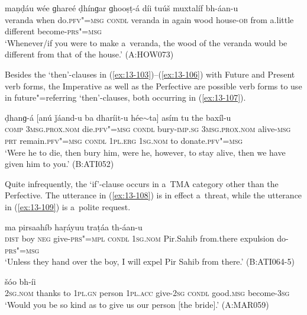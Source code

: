 \begin{exe}
\ex
\label{ex:13-106}
 maṇḍáu wée  ɡhareé ḍhínɡar ɡhooṣṭ-á díi tuúš muxtalíf bh-áan-u  \\
veranda when do.\textsc{pfv"=msg} \textsc{condl} veranda in  again wood house-\textsc{ob} from a.little different become-\textsc{prs"=msg} \\
\glt `Whenever/if you were to make a~veranda, the wood of the veranda would be different from that of the house.' (A:HOW073) 
\end{exe}

Besides the `then'-clauses in (\ref{ex:13-103})--(\ref{ex:13-106}) with Future and Present verb forms, the Imperative as well as the Perfective are possible verb forms to use in future"=referring `then'-clauses, both occurring in (\ref{ex:13-107}).

\begin{exe}
\ex
\label{ex:13-107}
 ḍhanɡ-á  [anú ǰáand-u ba dharíit-u
  hée$\sim$ta]  asím tu the baxíl-u \\
\textsc{comp} \textsc{3msg.prox.nom} die.\textsc{pfv"=msg} \textsc{condl} bury-\textsc{imp.sg}  \textsc{3msg.prox.nom} alive-\textsc{msg} \textsc{prt} remain.\textsc{pfv"=msg} \textsc{condl}  \textsc{1pl.erg} \textsc{1sg.nom} to donate.\textsc{pfv"=msg} \\
\glt `Were he to die, then bury him, were he, however, to stay alive, then we have given him to you.' (B:ATI052) 
\end{exe}

Quite infrequently, the `if'-clause occurs in a~TMA category other than the Perfective. The utterance in (\ref{ex:13-108}) is in effect a~threat, while the utterance in (\ref{ex:13-109}) is a~polite request.

\begin{exe}
\ex
\label{ex:13-108}
 ma  pirsaahíb haṛáyuu traṭáa th-áan-u \\
 \textsc{dist}{\protect\footnotemark} boy \textsc{neg} give-\textsc{prs"=mpl} \textsc{condl} \textsc{1sg.nom}  Pir.Sahib  from.there expulsion do-\textsc{prs"=msg} \\
\glt `Unless they hand over the boy, I will expel Pir Sahib from there.' (B:ATI064-5)

\ex
\label{ex:13-109}
 šóo bh-íi  \\
\textsc{2sg.nom} thanks to \textsc{1pl.gn} person \textsc{1pl.acc} give-\textsc{2sg}  \textsc{condl} good.\textsc{msg} become-\textsc{3sg} \\
\glt `Would you be so kind as to give us our person [the bride].' (A:MAR059) 
\end{exe}

